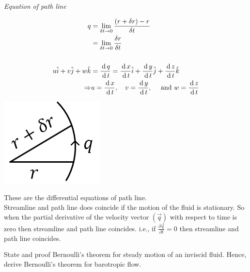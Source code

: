 \documentclass[12pt]{article}
\begin{document}
\begin{soln}
    \emph{Equation of path line}
    \begin{table}[H]
        \begin{minipage}{0.5\linewidth}
            \begin{align*}
                q&=\lim_{\delta t \to 0}\frac{\left( r+\delta r \right)-r}{\delta t}\\
                &=\lim_{\delta t \to 0}\frac{\delta r}{\delta t}\\
                &\\
                u\hat{i}+v\hat{j}+w\hat{k}&=\frac{\,\mathrm{d}\, q}{\,\mathrm{d}\, t}=\frac{\,\mathrm{d}\, x}{\,\mathrm{d}\, t}\hat{i}+\frac{\,\mathrm{d}\, y}{\,\mathrm{d}\, t}\hat{j}+\frac{\,\mathrm{d}\, z}{\,\mathrm{d}\, t}\hat{k}\\
                \Rightarrow& u=\frac{\,\mathrm{d}\, x}{\,\mathrm{d}\, t},\quad v=\frac{\,\mathrm{d}\, y}{\,\mathrm{d}\, t},\quad \text{ and } w=\frac{\,\mathrm{d}\, z}{\,\mathrm{d}\, t}
            \end{align*}
        \end{minipage}\hfill
        \begin{minipage}{0.45\linewidth}
            \centering
            \includegraphics[scale=1]{img/ass-1-2.1.png}
        \end{minipage}
    \end{table}
    These are the differential equations of path line.\\

    Streamline and path line does coincide if the motion of the fluid is stationary. So when the partial derivative of the velocity vector $ (\vec{q}) $ with respect to time is zero then streamline and path line coincides. i.e., if $ \frac{\partial \vec{q}}{\partial t}=0 $ then streamline and path line coincides.
\end{soln}
\newpage
\begin{prob}
    State and proof Bernoulli's theorem for steady motion of an inviscid fluid. Hence, derive Bernoulli's theorem for barotropic flow.
\end{prob}
\end{document}
